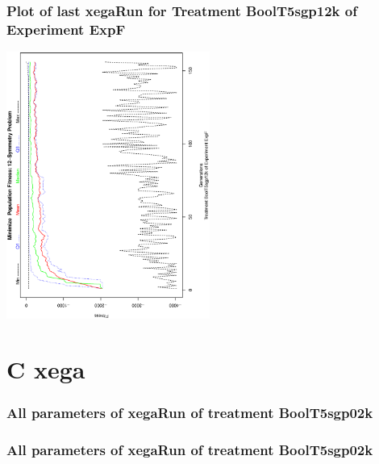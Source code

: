 \documentclass[18pt,c]{beamer}
\makeatletter
\let\beamer@writeslidentry@miniframeson=\beamer@writeslidentry
\newcommand*{\miniframeson}{\let\beamer@writeslidentry=\beamer@writeslidentry@miniframeson}
\makeatother
\begin{document}
 \begin{frame}
 \frametitle{ Plot of last xegaRun for Treatment BoolT5sgp12k of Experiment ExpF }
 \begin{center}
\includegraphics[width=0.5\textwidth, angle=-90]
{ExpFPlotPopStatsFigure010.eps}
 \end{center}
 \label{report/ExpFPlotPopStatsFigure010.eps}  
 \end{frame}

\miniframeson
\section{C xega}

 \begin{frame}
 \fontsize{8pt}{9pt}\selectfont
 \frametitle{  All parameters of xegaRun of treatment BoolT5sgp02k 
 }

 \label{ExpFtParmTable044.tex}  
 \end{frame}


 \begin{frame}
 \fontsize{8pt}{9pt}\selectfont
 \frametitle{  All parameters of xegaRun of treatment BoolT5sgp02k 
 }

 \label{ExpFtParmTable045.tex}  
 \end{frame}
\end{document}
